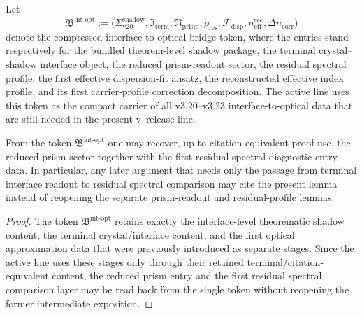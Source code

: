 \begin{definition}
\label{def:v320-crystal-shadow-interface-object}
\label{def:reduced-prism-readout-sector}
\label{def:prism-readout-residual-profile}
\label{def:first-effective-carrier-dispersion-fit-ansatz}
\label{def:first-reconstructed-effective-refractive-profile}
\label{def:first-carrier-profile-correction-decomposition}
Let
\[
\mathfrak B^{\mathrm{int\text{-}opt}}
:=
\bigl(
\Sigma^{\mathrm{shadow}}_{\mathrm{v20}},
\mathfrak I_{\mathrm{term}},
\mathfrak R_{\mathrm{prism}},
\rho_{\mathrm{res}},
\mathcal F_{\mathrm{disp}},
 n^{\mathrm{rec}}_{\mathrm{eff}},
 \Delta n_{\mathrm{corr}}
\bigr)
\]
denote the compressed interface-to-optical bridge token, where the entries stand respectively for the bundled theorem-level shadow package, the terminal crystal--shadow interface object, the reduced prism-readout sector, the residual spectral profile, the first effective dispersion-fit ansatz, the reconstructed effective index profile, and its first carrier-profile correction decomposition. The active line uses this token as the compact carrier of all v3.20--v3.23 interface-to-optical data that are still needed in the present v\docversion\ release line.
\end{definition}

\begin{lemma}
\label{lem:first-prism-readout-lemma-on-the-retained-carrier-surface}
\label{lem:first-residual-spectral-diagnostic-lemma}
From the token $\mathfrak B^{\mathrm{int\text{-}opt}}$ one may recover, up to citation-equivalent proof use, the reduced prism sector together with the first residual spectral diagnostic entry data. In particular, any later argument that needs only the passage from terminal interface readout to residual spectral comparison may cite the present lemma instead of reopening the separate prism-readout and residual-profile lemmas.
\end{lemma}

\begin{proof}
The token $\mathfrak B^{\mathrm{int\text{-}opt}}$ retains exactly the interface-level theorematic shadow content, the terminal crystal/interface content, and the first optical approximation data that were previously introduced as separate stages. Since the active line uses these stages only through their retained terminal/citation-equivalent content, the reduced prism entry and the first residual spectral comparison layer may be read back from the single token without reopening the former intermediate exposition.
\end{proof}

